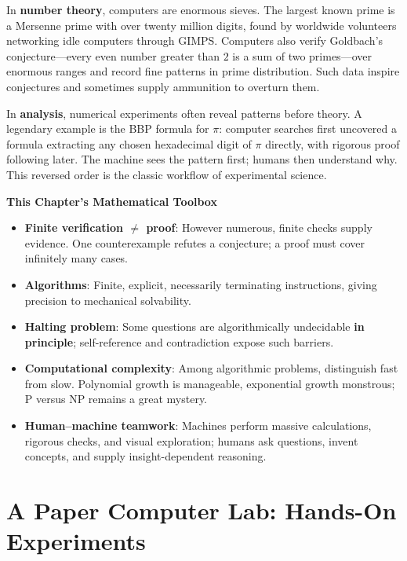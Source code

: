 In \textbf{number theory}, computers are enormous sieves. The largest known prime is a Mersenne prime with over twenty million digits, found by worldwide volunteers networking idle computers through GIMPS. Computers also verify Goldbach's conjecture---every even number greater than $2$ is a sum of two primes---over enormous ranges and record fine patterns in prime distribution. Such data inspire conjectures and sometimes supply ammunition to overturn them.

In \textbf{analysis}, numerical experiments often reveal patterns before theory. A legendary example is the BBP formula for $\pi$: computer searches first uncovered a formula extracting any chosen hexadecimal digit of $\pi$ directly, with rigorous proof following later. The machine sees the pattern first; humans then understand why. This reversed order is the classic workflow of experimental science.

\begin{toolbox}
\textbf{This Chapter's Mathematical Toolbox}

\begin{itemize}
\item \textbf{Finite verification $\neq$ proof}: However numerous, finite checks supply evidence. One counterexample refutes a conjecture; a proof must cover infinitely many cases.
\item \textbf{Algorithms}: Finite, explicit, necessarily terminating instructions, giving precision to mechanical solvability.
\item \textbf{Halting problem}: Some questions are algorithmically undecidable \textbf{in principle}; self-reference and contradiction expose such barriers.
\item \textbf{Computational complexity}: Among algorithmic problems, distinguish fast from slow. Polynomial growth is manageable, exponential growth monstrous; P versus NP remains a great mystery.
\item \textbf{Human--machine teamwork}: Machines perform massive calculations, rigorous checks, and visual exploration; humans ask questions, invent concepts, and supply insight-dependent reasoning.
\end{itemize}
\end{toolbox}

\section{A Paper Computer Lab: Hands-On Experiments}

